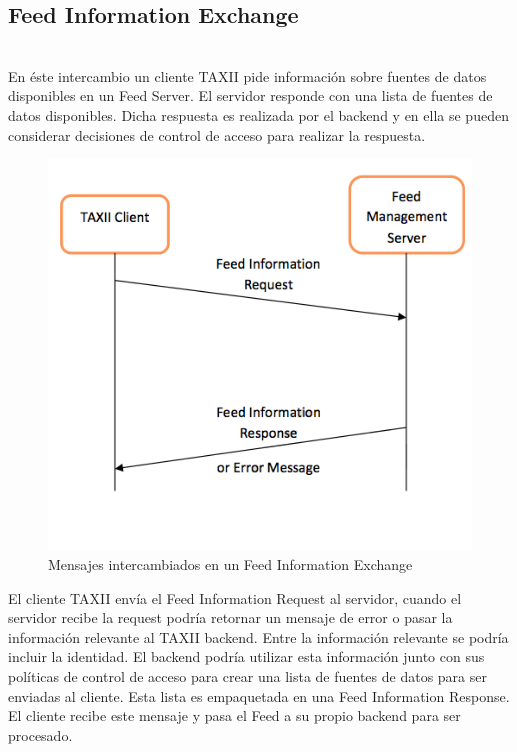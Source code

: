 \subsection{Feed Information Exchange}\ \\

En éste intercambio un cliente TAXII pide información sobre fuentes de datos disponibles en 
un Feed Server. El servidor responde con una lista de fuentes de datos 
disponibles. Dicha respuesta es realizada por el backend y en ella se pueden considerar 
decisiones de control de acceso para realizar la respuesta.\\

\begin{figure}[ht!]
  \centering
    \includegraphics[width=150mm]{./images/FeedInformationExchange.png}
    \caption{Mensajes intercambiados en un Feed Information Exchange \protect\cite{b1}}
\end{figure}

El cliente TAXII envía el Feed Information Request al 
servidor, cuando el servidor recibe la request podría retornar un mensaje de 
error o pasar la información relevante al TAXII backend. Entre la información 
relevante se podría incluir la identidad. El backend podría utilizar esta 
información junto con sus políticas de control de acceso para crear una lista de 
fuentes de datos para ser enviadas al cliente. Esta lista es empaquetada en una 
Feed Information Response. El cliente recibe este mensaje y pasa el Feed a su 
propio backend para ser procesado.

